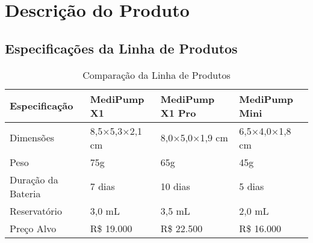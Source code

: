 \documentclass[12pt,a4paper]{report}
\begin{document}
\section{Descrição do Produto}
\subsection{Especificações da Linha de Produtos}

\begin{table}[H]
\centering
\caption{Comparação da Linha de Produtos}
\label{tab:product-comparison}
\begin{tabular}{@{}llll@{}}
\toprule
Especificação & MediPump X1 & MediPump X1 Pro & MediPump Mini \\
\midrule
Dimensões & 8,5×5,3×2,1 cm & 8,0×5,0×1,9 cm & 6,5×4,0×1,8 cm \\
Peso & 75g & 65g & 45g \\
Duração da Bateria & 7 dias & 10 dias & 5 dias \\
Reservatório & 3,0 mL & 3,5 mL & 2,0 mL \\
Preço Alvo & R\$ 19.000 & R\$ 22.500 & R\$ 16.000 \\
\bottomrule
\end{tabular}
\end{table}
\end{document}
